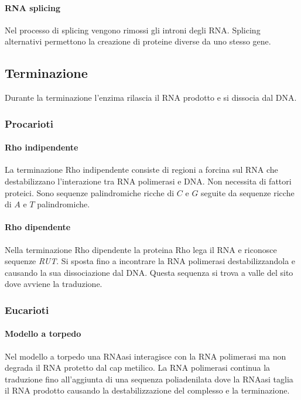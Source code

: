 			\paragraph{RNA splicing}
			Nel processo di splicing vengono rimossi gli introni degli RNA.
			Splicing alternativi permettono la creazione di proteine diverse da uno stesso gene.

	\subsection{Terminazione}
	Durante la terminazione l'enzima rilascia il RNA prodotto e si dissocia dal DNA.

		\subsubsection{Procarioti}

			\paragraph{Rho indipendente}
			La terminazione Rho indipendente consiste di regioni a forcina sul RNA che destabilizzano l'interazione tra RNA polimerasi e DNA.
			Non necessita di fattori proteici.
			Sono sequenze palindromiche ricche di $C$ e $G$ seguite da sequenze ricche di $A$ e $T$ palindromiche.

			\paragraph{Rho dipendente}
			Nella terminazione Rho dipendente la proteina Rho lega il RNA e riconosce sequenze \emph{RUT}.
			Si sposta fino a incontrare la RNA polimerasi destabilizzandola e causando la sua dissociazione dal DNA.
			Questa sequenza si trova a valle del sito dove avviene la traduzione.

		\subsubsection{Eucarioti}

			\paragraph{Modello a torpedo}
			Nel modello a torpedo una RNAasi interagisce con la RNA polimerasi ma non degrada il RNA protetto dal cap metilico.
			La RNA polimerasi continua la traduzione fino all'aggiunta di una sequenza poliadenilata dove la RNAasi taglia il RNA prodotto causando la destabilizzazione del complesso e la terminazione.

